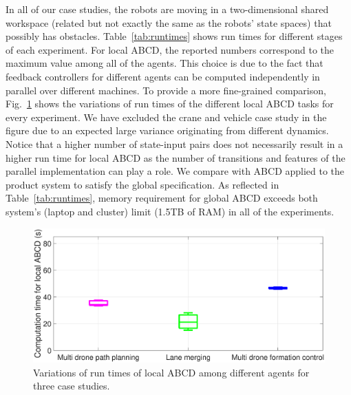 In all of our case studies, the robots are moving in a two-dimensional shared workspace (related but not exactly the same as the robots' state spaces) that possibly has obstacles. 
Table~\ref{tab:runtimes} shows run times for different stages of each experiment. 
For local ABCD, the reported numbers correspond to the maximum value among all of the agents. 
This choice is due to the fact that feedback controllers for different agents can be computed independently 
in parallel over different machines. 
To provide a more fine-grained comparison,
Fig.~\ref{fig:box_plot} shows the variations of run times of the different local ABCD tasks for every experiment. 
We have excluded the crane and vehicle case study in the figure due to an expected large variance originating from different dynamics. 
Notice that a higher number of state-input pairs does not necessarily result in a higher run time for local ABCD as the 
number of transitions and features of the parallel implementation can play a role. 
%
We compare \tool with ABCD applied to the product system to satisfy the global specification. 
As reflected in Table~\ref{tab:runtimes}, memory requirement for global ABCD exceeds both system's 
(laptop and cluster) limit (1.5TB of RAM) in all of the experiments.
%
%
\begin{figure}[t]
	\centering
	\includegraphics[width=0.95\columnwidth]{figures/final_box_plot.eps}
	\caption{Variations of run times of local ABCD among different agents for three case studies.}
	\label{fig:box_plot}
	\vspace{-.3cm}
\end{figure}
%
